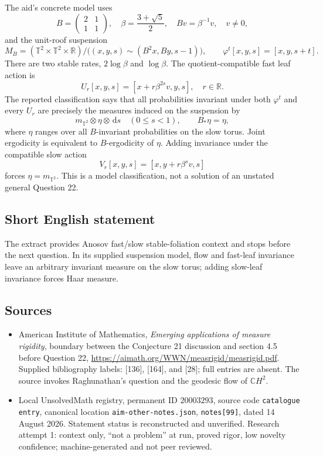 \documentclass[11pt]{article}
\newcommand{\R}{\mathbb{R}}
\newcommand{\dd}{\,\mathrm{d}}
\begin{document}
The aid's concrete model uses
\[
 B=\begin{pmatrix}2&1\\1&1\end{pmatrix},\quad
 \beta=\frac{3+\sqrt5}{2},\quad Bv=\beta^{-1}v,\quad v\ne0,
\]
and the unit-roof suspension
\[
 M_B=(\mathbb T^2\times\mathbb T^2\times\R)/
 \bigl((x,y,s)\sim(B^2x,By,s-1)\bigr),\qquad
 \varphi^t[x,y,s]=[x,y,s+t].
\]
There are two stable rates, $2\log\beta$ and $\log\beta$. The quotient-compatible fast leaf action is
\[
 U_r[x,y,s]=[x+r\beta^{2s}v,y,s],\quad r\in\R.
\]
The reported classification says that all probabilities invariant under both $\varphi^t$ and every $U_r$ are precisely the measures induced on the suspension by
\[
 m_{\mathbb T^2}\otimes\eta\otimes\dd s\quad(0\le s<1),
 \qquad B_*\eta=\eta,
\]
where $\eta$ ranges over all $B$-invariant probabilities on the slow torus. Joint ergodicity is equivalent to $B$-ergodicity of $\eta$. Adding invariance under the compatible slow action
\[
 V_r[x,y,s]=[x,y+r\beta^s v,s]
\]
forces $\eta=m_{\mathbb T^2}$. This is a model classification, not a solution of an unstated general Question 22.
\subsection{Short English statement}
The extract provides Anosov fast/slow stable-foliation context and stops before the next question. In its supplied suspension model, flow and fast-leaf invariance leave an arbitrary invariant measure on the slow torus; adding slow-leaf invariance forces Haar measure.
\subsection{Sources}
\begin{itemize}
\item American Institute of Mathematics, \emph{Emerging applications of measure rigidity}, boundary between the Conjecture 21 discussion and section 4.5 before Question 22, \url{https://aimath.org/WWN/measrigid/measrigid.pdf}. Supplied bibliography labels: [136], [164], and [28]; full entries are absent. The source invokes Raghunathan's question and the geodesic flow of $\mathbb C H^2$.
\item Local UnsolvedMath registry, permanent ID $20003293$, source code \texttt{catalogue entry}, canonical location \texttt{aim-other-notes.json}, \texttt{notes[99]}, dated 14 August 2026. Statement status is reconstructed and unverified. Research attempt 1: context only, ``not a problem'' at run, proved rigor, low novelty confidence; machine-generated and not peer reviewed.
\end{itemize}
\end{document}
